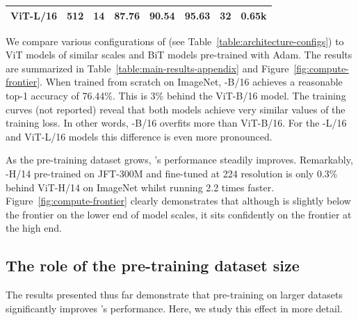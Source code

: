 \begin{table}[tb]
{\begin{tabular}{@{}lccccc@{\;}S[table-number-alignment=right,group-digits=false,mode=text]@{\;}S[table-number-alignment=left,mode=text]@{}}
    \ADot{} ViT-L/16 %
    \cite{Dosovitskiy2021} & 512 & 14 & 87.76 & 90.54 & 95.63 & 32 & 0.65k\\
    \bottomrule
  \end{tabular}}
  \vspace{-.4cm}
\end{table}

We compare various configurations of \name{} (see Table~\ref{table:architecture-configs}) to ViT models of similar scales and BiT models pre-trained with Adam. The results are summarized in Table~\ref{table:main-results-appendix} and Figure~\ref{fig:compute-frontier}.
When trained from scratch on ImageNet, \name{}-B/16 achieves a reasonable top-1 accuracy of 76.44\%. This is 3\% behind the ViT-B/16 model. The training curves (not reported) reveal that both models achieve very similar values of the training loss.
In other words, \name{}-B/16 overfits more than ViT-B/16.
For the \name{}-L/16 and ViT-L/16 models this difference is even more pronounced.

As the pre-training dataset grows, \name{}'s performance steadily improves.
Remarkably, \name{}-H/14 pre-trained on JFT-300M and fine-tuned at 224 resolution is only 0.3\% behind ViT-H/14 on ImageNet whilst running 2.2 times faster.
Figure~\ref{fig:compute-frontier} clearly demonstrates that although \name{} is slightly below the frontier on the lower end of model scales, it sits confidently on the frontier at the high end. 

\subsection{The role of the pre-training dataset size}

The results presented thus far demonstrate that pre-training on larger datasets significantly improves \name{}'s performance. Here, we study this effect in more detail.

